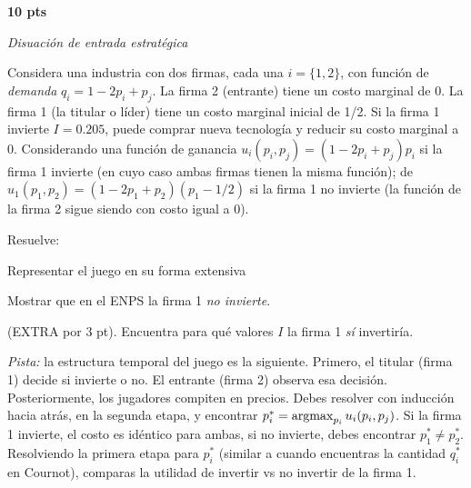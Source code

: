 \documentclass[12pt]{scrartcl}
\begin{document}
\begin{Exercise}[name={Problema}]

    \textbf{10 pts}

    \textit{Disuación de entrada estratégica}

    Considera una industria con dos firmas, cada una $i=\{1, 2 \}$, con función de \textit{demanda} $q_i = 1 - 2p_i + p_j$. La firma 2 (entrante) tiene un costo marginal de 0. La firma 1 (la titular o líder) tiene un costo marginal inicial de 1/2. Si la firma 1 invierte $I = 0.205$, puede comprar nueva tecnología y reducir su costo marginal a 0. Considerando una función de ganancia $u_i(p_i, p_j)=(1-2p_i+p_j)p_i$ si la firma 1 invierte (en cuyo caso ambas firmas tienen la misma función); de $u_1(p_1, p_2)=(1-2p_1+p_2)(p_1 - 1/2)$ si la firma 1 no invierte (la función de la firma 2 sigue siendo con costo igual a 0).

    Resuelve:

    \begin{myenum}
        \item Representar el juego en su forma extensiva
        \item Mostrar que en el ENPS la firma 1 \textit{no invierte}.
        \item (EXTRA por 3 pt). Encuentra para qué valores $I$ la firma 1 \textit{sí} invertiría.
    \end{myenum}

    \textit{Pista:} la estructura temporal del juego es la siguiente. Primero, el titular (firma 1) decide si invierte o no. El entrante (firma 2) observa esa decisión. Posteriormente, los jugadores compiten en precios. Debes resolver con inducción hacia atrás, en la segunda etapa, y encontrar $p_i^*=\operatorname*{argmax}_{p_i} u_i(p_i, p_j)$. Si la firma 1 invierte, el costo es idéntico para ambas, si no invierte, debes encontrar $p_1^* \neq p_2^*$. Resolviendo la primera etapa para $p_i^*$ (similar a cuando encuentras la cantidad $q_i^*$ en Cournot), comparas la utilidad de invertir vs no invertir de la firma 1.

\end{Exercise}
\end{document}
